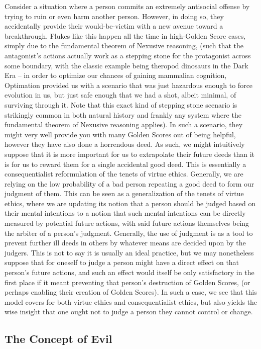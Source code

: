 Consider a situation where a person commits an extremely antisocial offense by trying to ruin or even harm another person. However, in doing so, they accidentally provide their would-be-victim with a new avenue toward a breakthrough. Flukes like this happen all the time in high-Golden Score cases, simply due to the fundamental theorem of Nexusive reasoning, (such that the antagonist's actions actually work as a stepping stone for the protagonist across some boundary, with the classic example being theropod dinosaurs in the Dark Era -- in order to optimize our chances of gaining mammalian cognition, Optimation provided us with a scenario that was just hazardous enough to force evolution in us, but just safe enough that we had a shot, albeit minimal, of surviving through it. Note that this exact kind of stepping stone scenario is strikingly common in both natural history and frankly any system where the fundamental theorem of Nexusive reasoning applies). In such a scenario, they might very well provide you with many Golden Scores out of being helpful, however they have also done a horrendous deed. As such, we might intuitively suppose that it is more important for us to extrapolate their future deeds than it is for us to reward them for a single accidental good deed. This is essentially a consequentialist reformulation of the tenets of virtue ethics. Generally, we are relying on the low probability of a bad person repeating a good deed to form our judgment of them. This can be seen as a generalization of the tenets of virtue ethics, where we are updating its notion that a person should be judged based on their mental intentions to a notion that such mental intentions can be directly measured by potential future actions, with said future actions themselves being the arbiter of a person's judgment. Generally, the use of judgment is as a tool to prevent further ill deeds in others by whatever means are decided upon by the judgers. This is not to say it is usually an ideal practice, but we may nonetheless suppose that for oneself to judge a person might have a direct effect on that person's future actions, and such an effect would itself be only satisfactory in the first place if it meant preventing that person's destruction of Golden Scores, (or perhaps enabling their creation of Golden Scores). In such a case, we see that this model covers for both virtue ethics and consequentialist ethics, but also yields the wise insight that one ought not to judge a person they cannot control or change. 

\subsection{The Concept of Evil}

